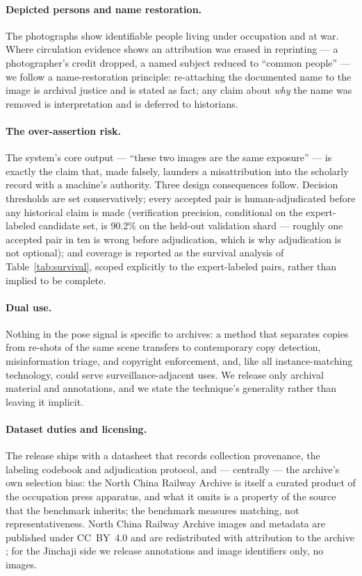 \documentclass[letterpaper]{article} %
\begin{document}
\paragraph{Depicted persons and name restoration.}
The photographs show identifiable people living under occupation and
at war. Where circulation evidence shows an attribution was erased in
reprinting --- a photographer's credit dropped, a named subject
reduced to ``common people'' \cite{du2024probing} --- we follow a
name-restoration principle: re-attaching the documented name to the
image is archival justice and is stated as fact; any claim about
\emph{why} the name was removed is interpretation and is deferred to
historians.

\paragraph{The over-assertion risk.}
The system's core output --- ``these two images are the same
exposure'' --- is exactly the claim that, made falsely, launders a
misattribution into the scholarly record with a machine's authority.
Three design consequences follow. Decision thresholds are set
conservatively; every accepted pair is human-adjudicated before any
historical claim is made (verification precision, conditional on the
expert-labeled candidate set, is 90.2\% on the held-out validation
shard --- roughly one accepted pair in ten is wrong before
adjudication, which is why adjudication is not optional); and coverage
is reported as the survival analysis of Table~\ref{tab:survival},
scoped explicitly to the expert-labeled pairs, rather than implied to
be complete.

\paragraph{Dual use.}
Nothing in the pose signal is specific to archives: a method that
separates copies from re-shots of the same scene transfers to
contemporary copy detection, misinformation triage, and copyright
enforcement, and, like all instance-matching technology, could serve
surveillance-adjacent uses. We release only archival material and
annotations, and we state the technique's generality rather than
leaving it implicit.

\paragraph{Dataset duties and licensing.}
The release ships with a datasheet \cite{gebru2021datasheets} that
records collection provenance, the labeling codebook and adjudication
protocol, and --- centrally --- the archive's own selection bias: the North
China Railway Archive is itself a curated product of the occupation
press apparatus, and what it omits is a property of the source that
the benchmark inherits; the benchmark measures matching, not
representativeness. North China Railway Archive images and metadata
are published under CC~BY~4.0 and are redistributed with attribution
to the archive \cite{ncrarchive2019}; for the Jinchaji side we release
annotations and image identifiers only, no images.
\end{document}
